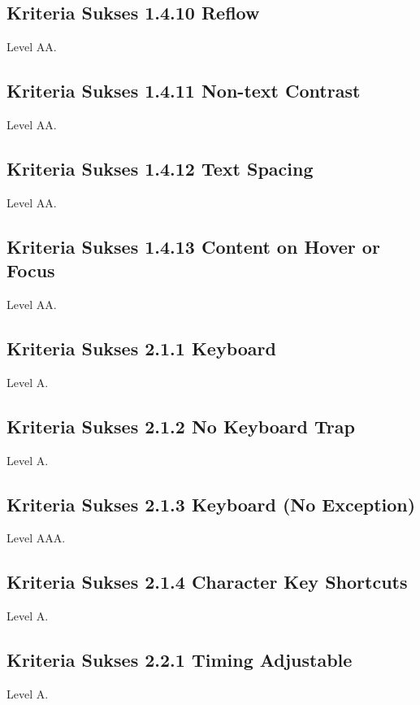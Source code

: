 {\subsection{Kriteria Sukses 1.4.10 Reflow}
\label{sec:kriteria_1.4.10}
Level AA.

\subsection{Kriteria Sukses 1.4.11 Non-text Contrast}
\label{sec:kriteria_1.4.11}
Level AA.

\subsection{Kriteria Sukses 1.4.12 Text Spacing}
\label{sec:kriteria_1.4.12}
Level AA.

\subsection{Kriteria Sukses 1.4.13 Content on Hover or Focus}
\label{sec:kriteria_1.4.13}
Level AA.

\subsection{Kriteria Sukses 2.1.1 Keyboard}
\label{sec:kriteria_2.1.1}
Level A.

\subsection{Kriteria Sukses 2.1.2 No Keyboard Trap}
\label{sec:kriteria_2.1.2}
Level A.

\subsection{Kriteria Sukses 2.1.3 Keyboard (No Exception)}
\label{sec:kriteria_2.1.3}
Level AAA.

\subsection{Kriteria Sukses 2.1.4 Character Key Shortcuts}
\label{sec:kriteria_2.1.4}
Level A.

\subsection{Kriteria Sukses 2.2.1 Timing Adjustable}
\label{sec:kriteria_2.2.1}
Level A.

}
